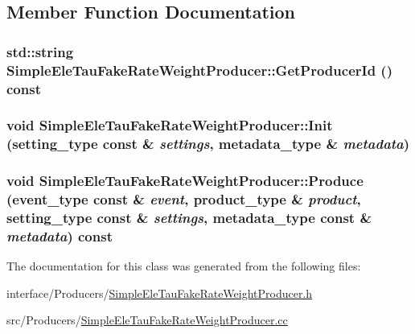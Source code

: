 \subsection{Member Function Documentation}
\hypertarget{classSimpleEleTauFakeRateWeightProducer_aeae1344b52e6ddd56356771a8aa199f0}{
\subsubsection[{GetProducerId}]{\setlength{\rightskip}{0pt plus 5cm}std::string SimpleEleTauFakeRateWeightProducer::GetProducerId () const}}
\label{classSimpleEleTauFakeRateWeightProducer_aeae1344b52e6ddd56356771a8aa199f0}
\hypertarget{classSimpleEleTauFakeRateWeightProducer_a996dec4b26d77e82380e5783cb2c3704}{
\subsubsection[{Init}]{\setlength{\rightskip}{0pt plus 5cm}void SimpleEleTauFakeRateWeightProducer::Init (setting\_\-type const \& {\em settings}, \/  metadata\_\-type \& {\em metadata})}}
\label{classSimpleEleTauFakeRateWeightProducer_a996dec4b26d77e82380e5783cb2c3704}
\hypertarget{classSimpleEleTauFakeRateWeightProducer_aa815dca2faf5a2a2a5ecf665f946e21f}{
\subsubsection[{Produce}]{\setlength{\rightskip}{0pt plus 5cm}void SimpleEleTauFakeRateWeightProducer::Produce (event\_\-type const \& {\em event}, \/  product\_\-type \& {\em product}, \/  setting\_\-type const \& {\em settings}, \/  metadata\_\-type const \& {\em metadata}) const}}
\label{classSimpleEleTauFakeRateWeightProducer_aa815dca2faf5a2a2a5ecf665f946e21f}


The documentation for this class was generated from the following files:\begin{DoxyCompactItemize}
\item 
interface/Producers/\hyperlink{SimpleEleTauFakeRateWeightProducer_8h}{SimpleEleTauFakeRateWeightProducer.h}\item 
src/Producers/\hyperlink{SimpleEleTauFakeRateWeightProducer_8cc}{SimpleEleTauFakeRateWeightProducer.cc}\end{DoxyCompactItemize}
